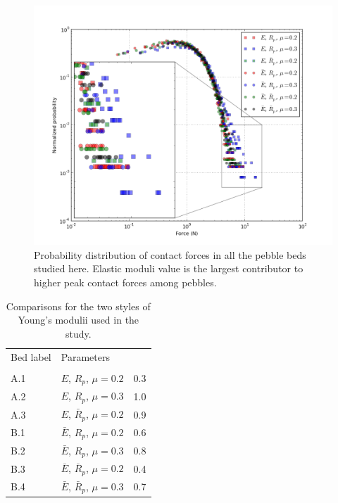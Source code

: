 \begin{figure}[t]
  \centering
  \includegraphics[width=\singleimagewidth]{chapters/figures/all-contact-forces}
  \caption{Probability distribution of contact forces in all the pebble beds studied here. Elastic moduli value is the largest contributor to higher peak contact forces among pebbles.}\label{fig:all-contact-forces}
\end{figure}


\begin{table}[t]
\caption{Comparisons for the two styles of Young's modulii used in the study. }
\label{tab:num-crush-percent}\centering
\begin{tabular}{llS[table-format=3.2]}
\toprule
Bed label		& 		Parameters 								&				\\
				& 												&			\\\otoprule
A.1				& 		$E$, $R_p$, $\mu = 0.2$          		&	0.3									\\\midrule
A.2				& 		$E$, $R_p$, $\mu = 0.3$     			&	1.0									\\\midrule
A.3				& 		$E$, $\bar{R}_p$, $\mu = 0.2$			&	0.9									\\\midrule
B.1				& 		$\bar{E}$, $R_p$, $\mu = 0.2$			&	0.6									\\\midrule
B.2				& 		$\bar{E}$, $R_p$, $\mu = 0.3$			&	0.8									\\\midrule
B.3				& 		$\bar{E}$, $\bar{R}_p$, $\mu = 0.2$		&	0.4									\\\midrule
B.4				& 		$\bar{E}$, $\bar{R}_p$, $\mu = 0.3$		&	0.7									\\\bottomrule
\end{tabular}
\end{table}






